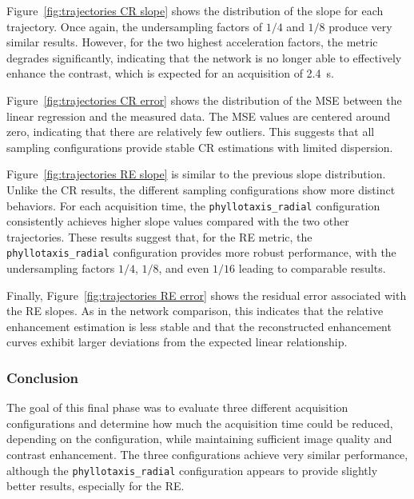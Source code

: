 \documentclass[12pt]{article}
\begin{document}
Figure~\ref{fig:trajectories CR slope} shows the distribution of the slope for each trajectory.
Once again, the undersampling factors of $1/4$ and $1/8$ produce very similar results.
However, for the two highest acceleration factors, the metric degrades significantly, indicating that the network is no longer able to effectively enhance the contrast, which is expected for an acquisition of 2.4~s.
\vspace{0.5cm}

Figure~\ref{fig:trajectories CR error} shows the distribution of the MSE between the linear regression and the measured data.
The MSE values are centered around zero, indicating that there are relatively few outliers.
This suggests that all sampling configurations provide stable CR estimations with limited dispersion.
\vspace{0.5cm}

Figure~\ref{fig:trajectories RE slope} is similar to the previous slope distribution.
Unlike the CR results, the different sampling configurations show more distinct behaviors.
For each acquisition time, the \texttt{phyllotaxis\_radial} configuration consistently achieves higher slope values compared with the two other trajectories.
These results suggest that, for the RE metric, the \texttt{phyllotaxis\_radial} configuration provides more robust performance, with the undersampling factors $1/4$, $1/8$, and even $1/16$ leading to comparable results.
\vspace{0.5cm}

Finally, Figure~\ref{fig:trajectories RE error} shows the residual error associated with the RE slopes.
As in the network comparison, this indicates that the relative enhancement estimation is less stable and that the reconstructed enhancement curves exhibit larger deviations from the expected linear relationship.

\subsubsection{Conclusion}

The goal of this final phase was to evaluate three different acquisition configurations and determine how much the acquisition time could be reduced, depending on the configuration, while maintaining sufficient image quality and contrast enhancement.
The three configurations achieve very similar performance, although the \texttt{phyllotaxis\_radial} configuration appears to provide slightly better results, especially for the RE.
\vspace{0.5cm}
\end{document}
